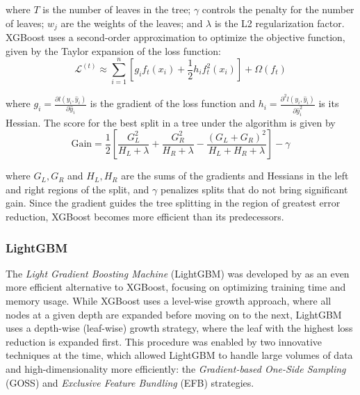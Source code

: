 where $T$ is the number of leaves in the tree; $\gamma$ controls the penalty for the number of leaves; $w_j$ are the weights of the leaves; and $\lambda$ is the L2 regularization factor.
XGBoost uses a second-order approximation to optimize the objective function, given by the Taylor expansion of the loss function:
\begin{equation}
\mathcal{L}^{(t)} \approx \sum_{i=1}^{n} \left[ g_i f_t(x_i) + \frac{1}{2} h_i f_t^2(x_i) \right] + \Omega(f_t)
\end{equation}

where $g_i = \frac{\partial l(y_i, \hat{y}_i)}{\partial \hat{y}_i}$ is the gradient of the loss function and $h_i = \frac{\partial^2 l(y_i, \hat{y}_i)}{\partial \hat{y}_i^2}$ is its Hessian. The score for the best split in a tree under the algorithm is given by
\begin{equation}
\text{Gain} = \frac{1}{2} \left[ \frac{G_L^2}{H_L + \lambda} + \frac{G_R^2}{H_R + \lambda} - \frac{(G_L + G_R)^2}{H_L + H_R + \lambda} \right] - \gamma
\end{equation}

where $G_L, G_R$ and $H_L, H_R$ are the sums of the gradients and Hessians in the left and right regions of the split, and $\gamma$ penalizes splits that do not bring significant gain. Since the gradient guides the tree splitting in the region of greatest error reduction, XGBoost becomes more efficient than its predecessors.

\subsubsection{LightGBM}
The \textit{Light Gradient Boosting Machine} (LightGBM) was developed by \cite{ke2017lightgbm} as an even more efficient alternative to XGBoost, focusing on optimizing training time and memory usage. While XGBoost uses a level-wise growth approach, where all nodes at a given depth are expanded before moving on to the next, LightGBM uses a depth-wise (leaf-wise) growth strategy, where the leaf with the highest loss reduction is expanded first. This procedure was enabled by two innovative techniques at the time, which allowed LightGBM to handle large volumes of data and high-dimensionality more efficiently: the \textit{Gradient-based One-Side Sampling} (GOSS) and \textit{Exclusive Feature Bundling} (EFB) strategies.

